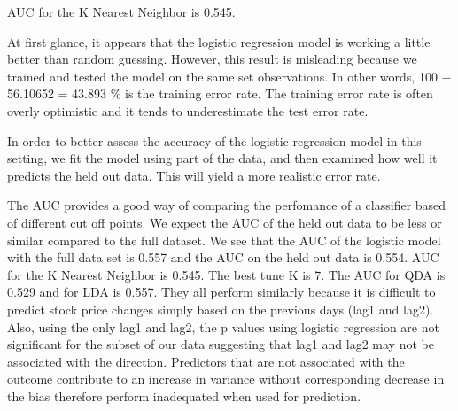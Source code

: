 \documentclass[]{article}
\begin{document}
AUC for the K Nearest Neighbor is 0.545.

At first glance, it appears that the logistic regression model is
working a little better than random guessing. However, this result is
misleading because we trained and tested the model on the same set
observations. In other words, 100 − 56.10652 = 43.893 \% is the training
error rate. The training error rate is often overly optimistic and it
tends to underestimate the test error rate.

In order to better assess the accuracy of the logistic regression model
in this setting, we fit the model using part of the data, and then
examined how well it predicts the held out data. This will yield a more
realistic error rate.

The AUC provides a good way of comparing the perfomance of a classifier
based of different cut off points. We expect the AUC of the held out
data to be less or similar compared to the full dataset. We see that the
AUC of the logistic model with the full data set is 0.557 and the AUC on
the held out data is 0.554. AUC for the K Nearest Neighbor is 0.545. The
best tune K is 7. The AUC for QDA is 0.529 and for LDA is 0.557. They
all perform similarly because it is difficult to predict stock price
changes simply based on the previous days (lag1 and lag2). Also, using
the only lag1 and lag2, the p values using logistic regression are not
significant for the subset of our data suggesting that lag1 and lag2 may
not be associated with the direction. Predictors that are not associated
with the outcome contribute to an increase in variance without
corresponding decrease in the bias therefore perform inadequated when
used for prediction.
\end{document}
